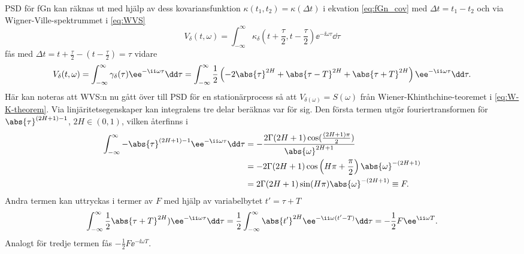 PSD för fGn kan räknas ut med hjälp av dess kovariansfunktion $\kappa(t_1,t_2)=\kappa(\Delta{t})$ i ekvation \eqref{eq:fGn_cov} med $\Delta{t}=t_1-t_2$ och via Wigner-Ville-spektrummet i \eqref{eq:WVS}
\begin{equation}
    V_{\delta}(t,\omega)
    =\int^{\infty}_{-\infty} 
    \kappa_{\delta}
    \left( t+\frac{\tau}{2},t-\frac{\tau}{2} \right) 
    \ee^{-\ii \omega\tau} \dd\tau
\end{equation}
fås med $\Delta{t}=t+\frac{\tau}{2}-(t-\frac{\tau}{2})=\tau$ vidare
\begin{equation} \label{eq:fGn_covterm}
    V_{\delta}(t, \omega)
    =
    \int^{\infty}_{-\infty} 
    \gamma_{\delta}(\tau) \ee^{-\ii \omega\tau} \dd\tau 
    = 
    \int^{\infty}_{-\infty} \frac{1}{2} 
    \left(
    -2\abs{\tau}^{2H} + \abs{\tau-T}^{2H} + \abs{\tau+T}^{2H}
    \right) 
    \ee^{-\ii \omega\tau} \dd\tau.
\end{equation}
Här kan noteras att WVS:n nu gått över till PSD för en stationärprocess så att $V_{\delta(\omega)}=S(\omega)$ från Wiener-Khinthchine-teoremet i \eqref{eq:W-K-theorem}. Via linjäritetsegenskaper kan integralens tre delar beräknas var för sig. Den första termen utgör fouriertransformen för $\abs{\tau}^{(2H+1)-1}$, $2H\in (0,1)$, vilken återfinns i \cite{BETA}
\begin{equation}
\begin{aligned}
    \int^{\infty}_{-\infty} -\abs{\tau}^{(2H+1)-1}\ee^{-\ii \omega\tau} \dd\tau 
    &= -\frac{
    2\Gamma(2H+1)
    \cos(\frac{(2H+1)\pi}{2})}{
    \abs{\omega}^{2H+1}} 
    \\ 
    &= -2\Gamma{(2H+1)} \cos\left(H\pi+\frac{\pi}{2}\right) \abs{\omega}^{-(2H+1)} 
    \\
    &= 2\Gamma{(2H+1)}\sin(H\pi) \abs{\omega}^{-(2H+1)} \equiv F.
\end{aligned}
\end{equation}
Andra termen kan uttryckas i termer av $F$ med hjälp av variabelbytet $t'=\tau+T$
\begin{equation}
\int^{\infty}_{-\infty}\frac{1}{2} \abs{\tau+T}^{2H})\ee^{-\ii \omega\tau} \dd\tau 
= \frac{1}{2}\int^{\infty}_{-\infty} \abs{t'}^{2H} \ee^{-\ii \omega(t'-T)} \dd\tau 
= -\frac{1}{2} F \ee^{\ii \omega T}.
\end{equation}
Analogt för tredje termen fås $-\frac{1}{2}F\ee^{-\ii \omega T}$. 

